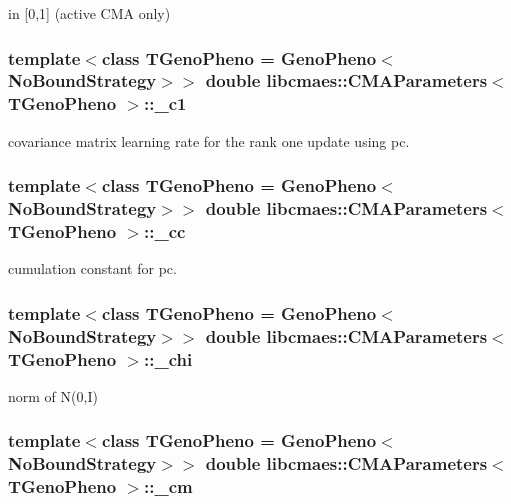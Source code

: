 in \mbox{[}0,1\mbox{]} (active C\-M\-A only) \hypertarget{classlibcmaes_1_1CMAParameters_ad6c921f865fc7fc344e8e1408baca772}{
\subsubsection[{\-\_\-c1}]{\setlength{\rightskip}{0pt plus 5cm}template$<$class T\-Geno\-Pheno = Geno\-Pheno$<$\-No\-Bound\-Strategy$>$$>$ double {\bf libcmaes\-::\-C\-M\-A\-Parameters}$<$ T\-Geno\-Pheno $>$\-::\-\_\-c1}}\label{classlibcmaes_1_1CMAParameters_ad6c921f865fc7fc344e8e1408baca772}
covariance matrix learning rate for the rank one update using pc. \hypertarget{classlibcmaes_1_1CMAParameters_af85bfd2cef329712654fc697f50d5b4a}{
\subsubsection[{\-\_\-cc}]{\setlength{\rightskip}{0pt plus 5cm}template$<$class T\-Geno\-Pheno = Geno\-Pheno$<$\-No\-Bound\-Strategy$>$$>$ double {\bf libcmaes\-::\-C\-M\-A\-Parameters}$<$ T\-Geno\-Pheno $>$\-::\-\_\-cc}}\label{classlibcmaes_1_1CMAParameters_af85bfd2cef329712654fc697f50d5b4a}
cumulation constant for pc. \hypertarget{classlibcmaes_1_1CMAParameters_ab63f8f5d707242ec981945df88a573db}{
\subsubsection[{\-\_\-chi}]{\setlength{\rightskip}{0pt plus 5cm}template$<$class T\-Geno\-Pheno = Geno\-Pheno$<$\-No\-Bound\-Strategy$>$$>$ double {\bf libcmaes\-::\-C\-M\-A\-Parameters}$<$ T\-Geno\-Pheno $>$\-::\-\_\-chi}}\label{classlibcmaes_1_1CMAParameters_ab63f8f5d707242ec981945df88a573db}
norm of N(0,\-I) \hypertarget{classlibcmaes_1_1CMAParameters_a34e3414332daf15d81b353c7de803e1d}{
\subsubsection[{\-\_\-cm}]{\setlength{\rightskip}{0pt plus 5cm}template$<$class T\-Geno\-Pheno = Geno\-Pheno$<$\-No\-Bound\-Strategy$>$$>$ double {\bf libcmaes\-::\-C\-M\-A\-Parameters}$<$ T\-Geno\-Pheno $>$\-::\-\_\-cm}}\label{classlibcmaes_1_1CMAParameters_a34e3414332daf15d81b353c7de803e1d}
